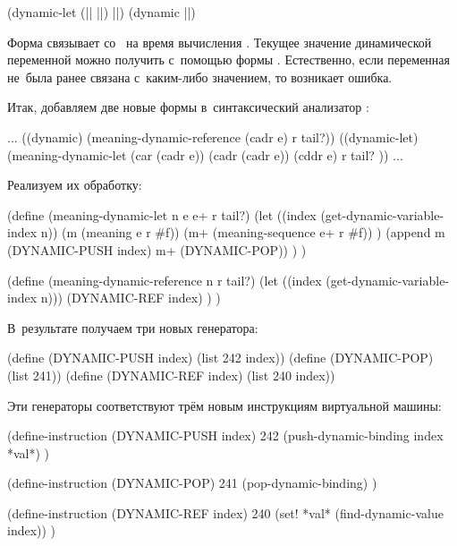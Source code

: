 \begin{code:lisp}
(dynamic-let (|| ||) ||)
(dynamic ||)
\end{code:lisp}

Форма  связывает  со~ на время
вычисления . Текущее значение динамической переменной можно получить
с~помощью формы . Естественно, если переменная не~была ранее связана
с~каким-либо значением, то возникает ошибка.

Итак, добавляем две новые формы в~синтаксический анализатор :

\begin{code:lisp}
...
((dynamic)     (meaning-dynamic-reference (cadr e) r tail?))
((dynamic-let) (meaning-dynamic-let (car (cadr e))
                                    (cadr (cadr e))
                                    (cddr e) r tail? ))
...
\end{code:lisp}

Реализуем их обработку:

\begin{code:lisp}
(define (meaning-dynamic-let n e e+ r tail?)
  (let ((index (get-dynamic-variable-index n))
        (m (meaning e r #f))
        (m+ (meaning-sequence e+ r #f)) )
    (append m (DYNAMIC-PUSH index) m+ (DYNAMIC-POP)) ) )

(define (meaning-dynamic-reference n r tail?)
  (let ((index (get-dynamic-variable-index n)))
    (DYNAMIC-REF index) ) )
\end{code:lisp}

В~результате получаем три новых генератора:

\begin{code:lisp}
(define (DYNAMIC-PUSH index) (list 242 index))
(define (DYNAMIC-POP)        (list 241))
(define (DYNAMIC-REF index)  (list 240 index))
\end{code:lisp}

Эти генераторы соответствуют трём новым инструкциям виртуальной машины:

\begin{code:lisp}
(define-instruction (DYNAMIC-PUSH index) 242
  (push-dynamic-binding index *val*) )

(define-instruction (DYNAMIC-POP) 241
  (pop-dynamic-binding) )

(define-instruction (DYNAMIC-REF index) 240
  (set! *val* (find-dynamic-value index)) )
\end{code:lisp}

